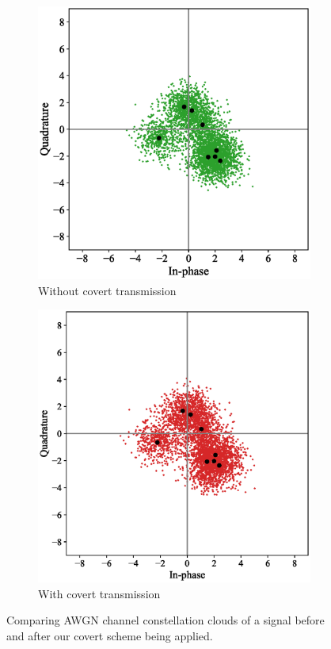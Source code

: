\begin{figure}[tp!]
	\begin{subfigure}{0.24\textwidth}
		\includegraphics[width=\linewidth]{figs/awgn_normal_constellation}
		\caption{Without covert transmission}
	\end{subfigure}
	\hfill
	\begin{subfigure}{0.24\textwidth}
		\includegraphics[width=\linewidth]{figs/awgn_covert_constellation}
		\caption{With covert transmission}	
	\end{subfigure}
	\caption{Comparing AWGN channel constellation clouds of a signal before and after our covert scheme being applied.}
	\label{fig:awgn_constellation}
\end{figure}
